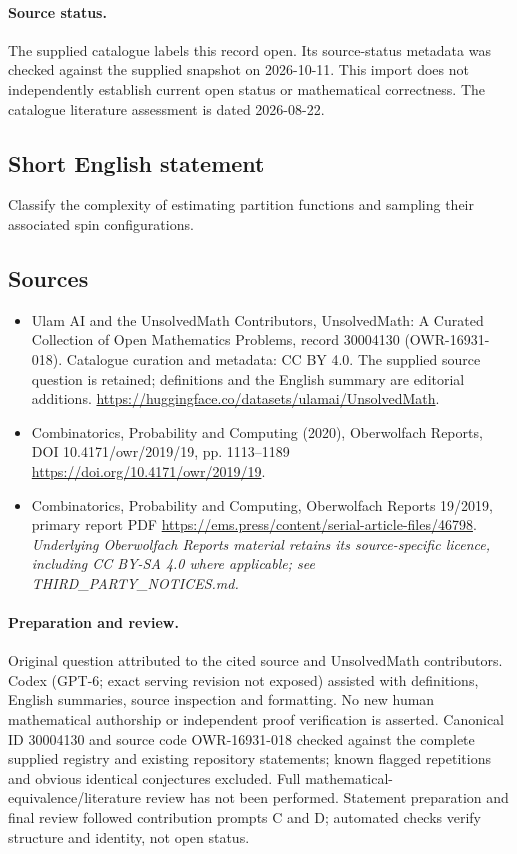 \documentclass[11pt]{article}
\begin{document}
\paragraph{Source status.}
The supplied catalogue labels this record open. Its source-status metadata was checked against the supplied snapshot on 2026-10-11. This import does not independently establish current open status or mathematical correctness. The catalogue literature assessment is dated 2026-08-22.
\subsection{Short English statement}
Classify the complexity of estimating partition functions and sampling their associated spin configurations.
\subsection{Sources}
\begin{itemize}
\item[\hypertarget{source:30004130:1}{S1}] Ulam AI and the UnsolvedMath Contributors, UnsolvedMath: A Curated Collection of Open Mathematics Problems, record 30004130 (OWR-16931-018). Catalogue curation and metadata: CC BY 4.0. The supplied source question is retained; definitions and the English summary are editorial additions.
\url{https://huggingface.co/datasets/ulamai/UnsolvedMath}.
\item[\hypertarget{source:30004130:2}{S2}] Combinatorics, Probability and Computing (2020), Oberwolfach Reports, DOI 10.4171/owr/2019/19, pp. 1113--1189
\url{https://doi.org/10.4171/owr/2019/19}.
\item[\hypertarget{source:30004130:3}{S3}] Combinatorics, Probability and Computing, Oberwolfach Reports 19/2019, primary report PDF
\url{https://ems.press/content/serial-article-files/46798}.
\textit{Underlying Oberwolfach Reports material retains its source-specific licence, including CC BY-SA 4.0 where applicable; see THIRD\_PARTY\_NOTICES.md.}
\end{itemize}
\paragraph{Preparation and review.}
Original question attributed to the cited source and UnsolvedMath contributors. Codex (GPT-6; exact serving revision not exposed) assisted with definitions, English summaries, source inspection and formatting. No new human mathematical authorship or independent proof verification is asserted. Canonical ID 30004130 and source code OWR-16931-018 checked against the complete supplied registry and existing repository statements; known flagged repetitions and obvious identical conjectures excluded. Full mathematical-equivalence/literature review has not been performed. Statement preparation and final review followed contribution prompts C and D; automated checks verify structure and identity, not open status.
\label{end:30004130}
\end{document}
